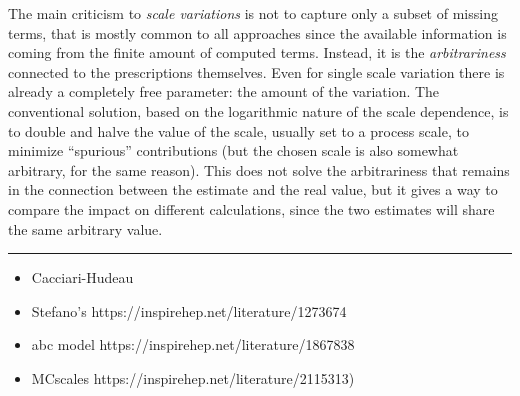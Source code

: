 The main criticism to \textit{scale variations} is not to capture only a subset
of missing terms, that is mostly common to all approaches since the available
information is coming from the finite amount of computed terms.
Instead, it is the \textit{arbitrariness} connected to the prescriptions
themselves.
%
Even for single scale variation there is already a completely free parameter:
the amount of the variation.
%
The conventional solution, based on the logarithmic nature of the scale
dependence, is to double and halve the value of the scale, usually set to a
process scale, to minimize \enquote{spurious} contributions (but the chosen
scale is also somewhat arbitrary, for the same reason).
%
This does not solve the arbitrariness that remains in the connection between
the estimate and the real value, but it gives a way to compare the impact on
different calculations, since the two estimates will share the same arbitrary
value.

\vspace*{20pt}
\noindent
\rule{\hsize}{1pt}

\begin{itemize}
	\item Cacciari-Hudeau
	\item  Stefano's https://inspirehep.net/literature/1273674
	\item abc model https://inspirehep.net/literature/1867838
	\item MCscales https://inspirehep.net/literature/2115313)
\end{itemize} 

